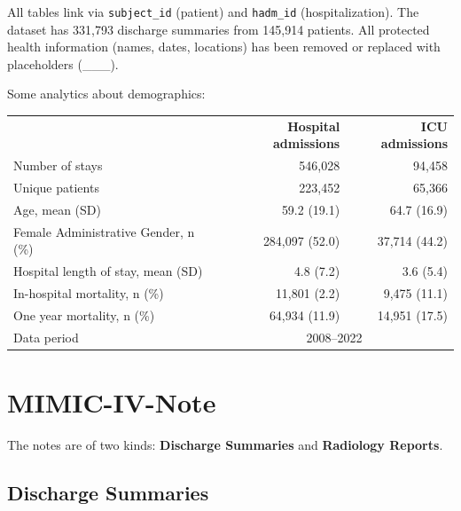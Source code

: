 \documentclass[11pt,a4paper]{article}
\newcommand{\field}[1]{\nolinkurl{#1}}
\newcommand{\mr}{\specialrule{0.4pt}{4pt}{4pt}}
\begin{document}
\vspace{3mm}

All tables link via \field{subject\_id} (patient) and \field{hadm\_id} (hospitalization). The dataset has 331,793 discharge summaries from 145,914 patients. All protected health information (names, dates, locations) has been removed or replaced with placeholders (\_\_\_).

Some analytics about demographics:

\begin{center}
	\begin{tabular}{lrr}
		                                     & \textbf{Hospital admissions}   & \textbf{ICU admissions} \\
		\mr
		Number of stays                      & 546,028                        & 94,458                  \\
		Unique patients                      & 223,452                        & 65,366                  \\
		Age, mean (SD)                       & 59.2 (19.1)                    & 64.7 (16.9)             \\
		Female Administrative Gender, n (\%) & 284,097 (52.0)                 & 37,714 (44.2)           \\
		Hospital length of stay, mean (SD)   & 4.8 (7.2)                      & 3.6 (5.4)               \\
		In-hospital mortality, n (\%)        & 11,801 (2.2)                   & 9,475 (11.1)            \\
		One year mortality, n (\%)           & 64,934 (11.9)                  & 14,951 (17.5)           \\
		\mr
		Data period                          & \multicolumn{2}{c}{2008--2022}                           \\
	\end{tabular}
\end{center}

\section{MIMIC-IV-Note}

The notes are of two kinds: \textbf{Discharge Summaries} and \textbf{Radiology Reports}.

\subsection{Discharge Summaries}
\label{sec:note-structure}
\end{document}
